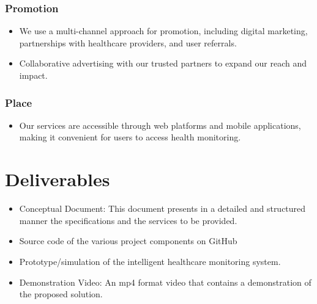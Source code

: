 \documentclass[12pt]{article}
\begin{document}
\subsubsection{Promotion}
\begin{itemize}
    \item We use a multi-channel approach for promotion, including digital marketing, partnerships with healthcare providers, and user referrals.
    \item Collaborative advertising with our trusted partners to expand our reach and impact.

\end{itemize}
\subsubsection{Place}
\begin{itemize}
    \item Our services are accessible through web platforms and mobile applications, making it convenient for users to access health monitoring.
\end{itemize}

\section{Deliverables}
\begin{itemize}
    \item Conceptual Document: This document presents in a detailed and structured manner the specifications and the services to be provided.
    \item Source code of the various project components on GitHub
    \item Prototype/simulation of the intelligent healthcare monitoring system.
    \item Demonstration Video: An mp4 format video that contains a demonstration of the proposed solution.
\end{itemize}
\end{document}
